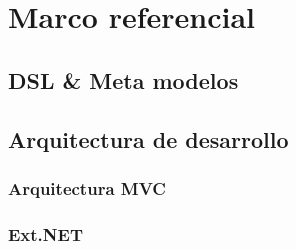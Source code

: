 \section[Marco referencial]{Marco referencial}

\subsection[DSL \& Meta modelos]{DSL \& Meta modelos}



\subsection{Arquitectura de desarrollo}

\subsubsection[Arquitectura MVC]{Arquitectura MVC}
\subsubsection[Ext.NET como motor de renderizado de vistas]{Ext.NET}
